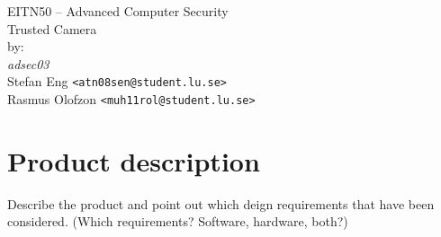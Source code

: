 \documentclass[10pt]{article}
\newcommand{\comm}[1]{{\leavevmode\color{gray}#1}}
\begin{document}

  \thispagestyle{empty}
  \vspace*{3cm}
  \begin{center}
    \huge{EITN50 -- Advanced Computer Security} \\
    \vspace{0.3cm}
    \LARGE{Trusted Camera} \\
    \vspace{1cm}
    \large{by: \\ \vspace{0.2cm}
	\textit{adsec03} \\
        Stefan Eng \texttt{<atn08sen@student.lu.se>} \\
        Rasmus Olofzon \texttt{<muh11rol@student.lu.se>}
        } \\
  \end{center}


  \newpage

  \section{Product description}

    \comm{Describe the product and point out which deign requirements that have
    been considered. (Which requirements? Software, hardware, both?)}
\end{document}
